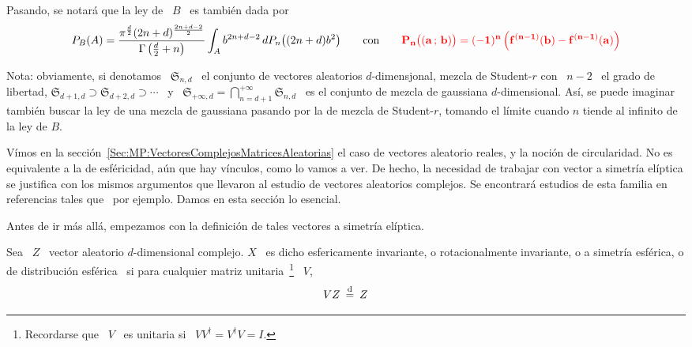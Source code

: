 Pasando, se notar\'a que la ley de \ $B$ \ es tambi\'en dada por
%
\[
P_B(A) = \frac{\pi^{\frac{d}{2}} (2 n + d)^{\frac{2 n + d - 2}{2}}}{\Gamma\left(
    \frac{d}{2} + n \right)}  \int_A b^{2 n + d - 2} \, dP_n\big(  (2 n + d) b^2
\big)  \qquad \mbox{con}  \qquad {\color{red}\bf P_n\big(  (a \, ; \,  b) \big)  =  (-1)^n \left(
    f^{(n-1)}(b) - f^{(n-1)}(a) \right)}
\]


Nota: obviamente, si denotamos \  $\mathfrak{S}_{n,d}$ \ el conjunto de vectores
aleatorios  $d$-dimensjonal, mezcla de  Student-$r$ con  \ $n-2$  \ el  grado de
libertad, $\mathfrak{S}_{d+1,d} \supset \mathfrak{S}_{d+2,d} \supset \cdots$ \ y
\    $\displaystyle    \mathfrak{S}_{+\infty,d}   =    \bigcap_{n=d+1}^{+\infty}
\mathfrak{S}_{n,d}$    \   es    el    conjunto   de    mezcla   de    gaussiana
$d$-dimensional. As\'i, se puede imaginar  tambi\'en buscar la ley de una mezcla
de gaussiana pasando por la de mezcla de Student-$r$, tomando el l\'imite cuando
$n$ tiende al infinito de la ley de $B$.



\label{Ssec:MP:FamiliaElipticaCompleja}


V\'imos en la secci\'on~\ref{Sec:MP:VectoresComplejosMatricesAleatorias} el caso
de vectores aleatorio reales, y la noci\'on de circularidad. No es equivalente a
la de esf\'ericidad, a\'un que hay v\'inculos, como lo vamos a ver. De hecho, la
necesidad de  trabajar con vector a  simetr\'ia el\'iptica se  justifica con los
mismos argumentos que  llevaron al estudio de vectores  aleatorios complejos. Se
encontrar\'a estudios  de esta familia en  referencias tales que~\cite{KriLin86,
  MicDey06,  OllEri11,  OllTyl12, FanKot90,  BesAbr13,  BauPas07, ChiPas08}  por
ejemplo. Damos en esta secci\'on lo esencial.

Antes de  ir m\'as  all\'a, empezamos  con la definici\'on  de tales  vectores a
simetr\'ia el\'iptica.
%
\begin{definicion}
  Sea  \  $Z$ \  vector  aleatorio $d$-dimensional  complejo.   $X$  \ es  dicho
  esfericamente  invariante,  o   rotacionalmente  invariante,  o  a  simetr\'ia
  esf\'erica,  o  de  distribuci\'on  esf\'erica  \  si  para  cualquier  matriz
  unitaria~\footnote{Recordarse que \ $V$ \ es  unitaria si \ $V V^\dag = V^\dag
    V = I$.} \ $V$,
  \[
  V  Z  \: \stackrel{\mathrm{d}}{=}  \: Z
  \]
\end{definicion}

